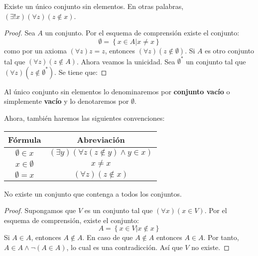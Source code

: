 \documentclass[12pt]{report}
\theoremstyle{largebreak}
\begin{document}
    \begin{theor}
        Existe un único conjunto sin elementos. En otras palabras, $(\exists! x)(\forall z)(z\notin x)$.
    \end{theor}

    \begin{proof}
        Sea $A$ un conjunto. Por el esquema de comprensión existe el conjunto:
        \begin{equation*}
            \emptyset=\left\{x\in A\Big|x\neq x \right\}
        \end{equation*}
        como por un axioma $(\forall z)z=z$, entonces $(\forall z)(z\notin \emptyset)$. Si $A$ es otro conjunto tal que $(\forall z)(z\notin A)$. Ahora veamos la unicidad. Sea $\emptyset^*$ un conjunto tal que $(\forall z)(z\notin \emptyset^*)$. Se tiene que:
    \end{proof}

    \begin{mydef}
        Al único conjunto sin elementos lo denominaremos por \textbf{conjunto vacío} o simplemente \textbf{vacío} y lo denotaremos por $\emptyset$.
    \end{mydef}

    Ahora, también haremos las siguientes convenciones:
    \begin{center}
        \begin{tabular}{cc}
            \hline
            Fórmula & Abreviación \\
            \hline
            $\emptyset\in x$ & $(\exists y)(\forall z(z\notin y)\land y\in x )$ \\
            $x\in\emptyset$ & $x\neq x$ \\
            $\emptyset = x$ & $(\forall z)(z\notin x)$ \\
            \hline
        \end{tabular}
    \end{center}
    
    \begin{theor}
        No existe un conjunto que contenga a todos los conjuntos.
    \end{theor}

    \begin{proof}
        Supongamos que $V$ es un conjunto tal que $(\forall x)(x\in V)$. Por el esquema de comprensión, existe el conjunto:
        \begin{equation*}
            A=\left\{x\in V\Big|x\notin x \right\}
        \end{equation*}
        Si $A\in A$, entonces $A\notin A$. En caso de que $A\notin A$ entonces $A\in A$. Por tanto, $A\in A\land \neg(A\in A)$, lo cual es una contradicción. Así que $V$ no existe.
    \end{proof}
\end{document}
